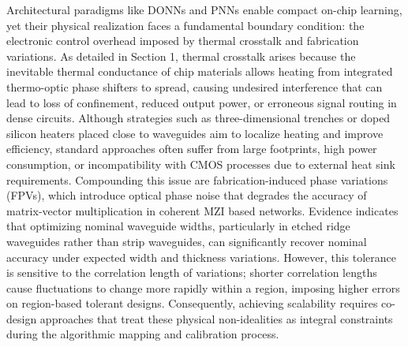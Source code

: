 Architectural paradigms like DONNs and PNNs enable compact on-chip learning, yet their physical realization faces a fundamental boundary condition: the electronic control overhead imposed by thermal crosstalk and fabrication variations. As detailed in Section 1, thermal crosstalk arises because the inevitable thermal conductance of chip materials allows heating from integrated thermo-optic phase shifters to spread, causing undesired interference that can lead to loss of confinement, reduced output power, or erroneous signal routing in dense circuits. \citep{doi_10_1109_access_2020_3013116_8fec1fb2} Although strategies such as three-dimensional trenches or doped silicon heaters placed close to waveguides aim to localize heating and improve efficiency, standard approaches often suffer from large footprints, high power consumption, or incompatibility with CMOS processes due to external heat sink requirements. Compounding this issue are fabrication-induced phase variations (FPVs), which introduce optical phase noise that degrades the accuracy of matrix-vector multiplication in coherent MZI based networks. Evidence indicates that optimizing nominal waveguide widths, particularly in etched ridge waveguides rather than strip waveguides, can significantly recover nominal accuracy under expected width and thickness variations. However, this tolerance is sensitive to the correlation length of variations; shorter correlation lengths cause fluctuations to change more rapidly within a region, imposing higher errors on region-based tolerant designs. Consequently, achieving scalability requires co-design approaches that treat these physical non-idealities as integral constraints during the algorithmic mapping and calibration process. \citep{doi_10_1109_access_2020_3013116_8fec1fb2} \citep{doi_10_1109_tnano_2022_3223915_d4da3e6b}

